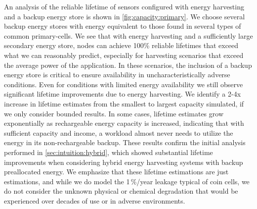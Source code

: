 An analysis of the reliable lifetime of sensors configured with energy
harvesting and a backup energy store is shown in \cref{fig:capacity:primary}.
We choose several backup energy
stores with energy equivalent to those found in several types of common
primary-cells. We see that with energy harvesting and a sufficiently
large secondary energy store, nodes can
achieve 100\% reliable lifetimes that exceed
what we can reasonably predict, especially for harvesting scenarios that
exceed the average power of the application. In these scenarios, 
the inclusion of a backup energy store is critical 
to ensure availability in uncharacteristically adverse conditions.
Even for conditions with
limited energy availability we still observe significant lifetime improvements
due to energy harvesting.
We identify a 2-4x increase in lifetime estimates from the smallest to largest
capacity simulated, if we only consider bounded results.
In some cases, lifetime estimates grow exponentially as rechargeable energy capacity is increased, indicating that with sufficient capacity and income, a workload almost never needs to utilize the energy in its non-rechargeable backup.
These results confirm the initial analysis performed in \cref{sec:intuition:hybrid}, which showed substantial lifetime improvements when considering hybrid energy harvesting systems with backup preallocated energy.
We emphasize that
these lifetime estimations are
just estimations, and while we do model the 1\,\%/year leakage
typical of coin cells, we do not consider the unknown
physical or chemical degradation that would be experienced over decades of use or in adverse environments.


